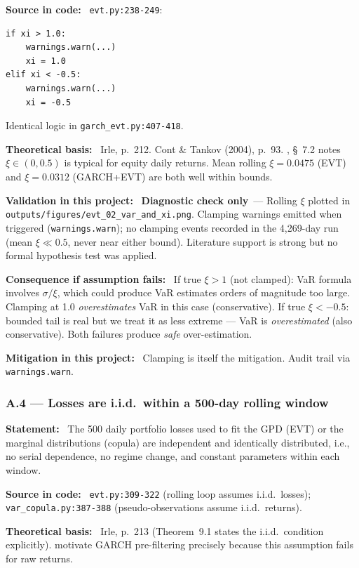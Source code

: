 \documentclass[11pt,a4paper]{article}
\newcommand{\asmfield}[1]{\medskip\noindent\textbf{#1:}\ }
\newcommand{\code}[1]{\texttt{#1}}
\newcommand{\diagnostic}{\textbf{Diagnostic check only}}
\begin{document}
\asmfield{Source in code}
\code{evt.py:238-249}:
\begin{lstlisting}
if xi > 1.0:
    warnings.warn(...)
    xi = 1.0
elif xi < -0.5:
    warnings.warn(...)
    xi = -0.5
\end{lstlisting}
Identical logic in \code{garch\_evt.py:407-418}.

\asmfield{Theoretical basis}
Irle, p.~212. Cont \& Tankov (2004), p.~93. \cite{McNeilFreyEmbrechts2005},
\S~7.2 notes $\xi \in (0, 0.5)$ is typical for equity daily returns.
Mean rolling $\xi = 0.0475$ (EVT) and $\xi = 0.0312$ (GARCH+EVT) are
both well within bounds.

\asmfield{Validation in this project}
\diagnostic\ --- Rolling $\xi$ plotted in \code{outputs/figures/evt\_02\_var\_and\_xi.png}.
Clamping warnings emitted when triggered (\code{warnings.warn}); no
clamping events recorded in the 4{,}269-day run (mean $\xi \ll 0.5$,
never near either bound). Literature support is strong but no formal
hypothesis test was applied.

\asmfield{Consequence if assumption fails}
If true $\xi > 1$ (not clamped): VaR formula involves $\sigma/\xi$, which
could produce VaR estimates orders of magnitude too large. Clamping at 1.0
\emph{overestimates} VaR in this case (conservative). If true $\xi < -0.5$:
bounded tail is real but we treat it as less extreme --- VaR is
\emph{overestimated} (also conservative). Both failures produce \emph{safe}
over-estimation.

\asmfield{Mitigation in this project}
Clamping is itself the mitigation. Audit trail via \code{warnings.warn}.

\subsubsection{A.4 --- Losses are i.i.d.\ within a 500-day rolling window}\label{asm:A4}

\asmfield{Statement}
The 500 daily portfolio losses used to fit the GPD (EVT) or the marginal
distributions (copula) are independent and identically distributed, i.e.,
no serial dependence, no regime change, and constant parameters within
each window.

\asmfield{Source in code}
\code{evt.py:309-322} (rolling loop assumes i.i.d.\ losses);
\code{var\_copula.py:387-388} (pseudo-observations assume i.i.d.\ returns).

\asmfield{Theoretical basis}
Irle, p.~213 (Theorem~9.1 states the i.i.d.\ condition explicitly).
\cite{McNeilFrey2000} motivate GARCH pre-filtering precisely because this
assumption fails for raw returns.
\end{document}
